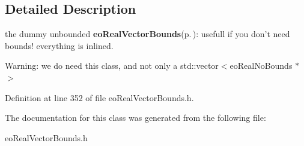 \subsection{Detailed Description}
the dummy unbounded {\bf eo\-Real\-Vector\-Bounds}{\rm (p.\,\pageref{classeo_real_vector_bounds})}: usefull if you don't need bounds! everything is inlined. 

Warning: we do need this class, and not only a std::vector$<$eo\-Real\-No\-Bounds $\ast$$>$ 



Definition at line 352 of file eo\-Real\-Vector\-Bounds.h.

The documentation for this class was generated from the following file:\begin{CompactItemize}
\item 
eo\-Real\-Vector\-Bounds.h\end{CompactItemize}
